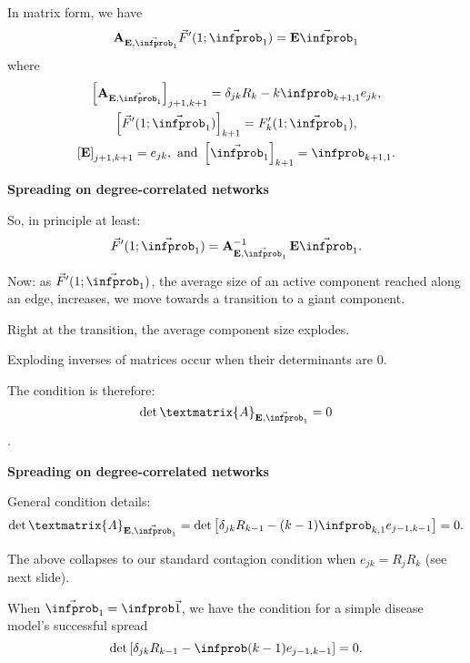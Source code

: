     In matrix form, we have
    $$
    \mathbf{A}_{\mathbf{E},\vec{\infprob}_1 }
    \vec{F}'(1;\vec{\infprob}_1)
    =
    \mathbf{E} \vec{\infprob}_1
    $$
    where 
    \begin{gather}
      \nonumber
      \left[ \mathbf{A}_{\mathbf{E},\vec{\infprob}_1 } \right]_{j+1,k+1}
      = 
      \delta_{jk} R_{k} 
      -
      k \infprob_{k+1,1} e_{jk},
      \\
      \nonumber
      \left[ \vec{F}'(1;\vec{\infprob}_1)  \right]_{k+1}
      = 
      F_{k}'(1;\vec{\infprob}_1),
      \\
      \nonumber
      \left[ \mathbf{E} \right]_{j+1,k+1}
      = 
      e_{jk},
      \
      \mbox{and} \  \left[ \vec{\infprob}_1 \right]_{k+1}
      =
      \infprob_{k+1,1}.
    \end{gather}
  

  \textbf{Spreading on degree-correlated networks}

  
  
    So, in principle at least:
    $$
    \vec{F}'(1;\vec{\infprob}_1)
    =
    \mathbf{A}_{\mathbf{E},\vec{\infprob}_1 }^{-1}
    \, \mathbf{E} \vec{\infprob}_1.
    $$
  
    Now: as $\vec{F}'(1;\vec{\infprob}_1)$, 
    the average size of an active component
    reached along an edge, increases, we move towards
    a transition to a giant component.
  
    Right at the transition, the average component
    size explodes.
  
    Exploding inverses of matrices occur
    when their determinants are 0. 
  
    The condition is therefore: 
    $$\det{\textmatrix{A}_{\mathbf{E},\vec{\infprob}_1}} = 0$$.
 


  \textbf{Spreading on degree-correlated networks}

  
   General condition details:
    $$
    \det{\textmatrix{A}_{\mathbf{E},\vec{\infprob}_1}}
    =
    \det
    \left[
      \delta_{jk} R_{k-1} 
      -
      (k-1) \infprob_{k,1} e_{j-1,k-1}
    \right] = 0.
    $$
  
    The above collapses to our standard
    contagion condition when $e_{jk} = R_j R_k$ (see next slide).\cite{dodds2009a}
  
    When $\vec{\infprob}_1=\infprob \vec{1}$, we have the condition
    for a simple disease model's successful spread
    $$
    \det
    \left[
      \delta_{jk} R_{k-1} 
      -
      \infprob (k-1)   e_{j-1,k-1}
    \right] = 0.
    $$
   
